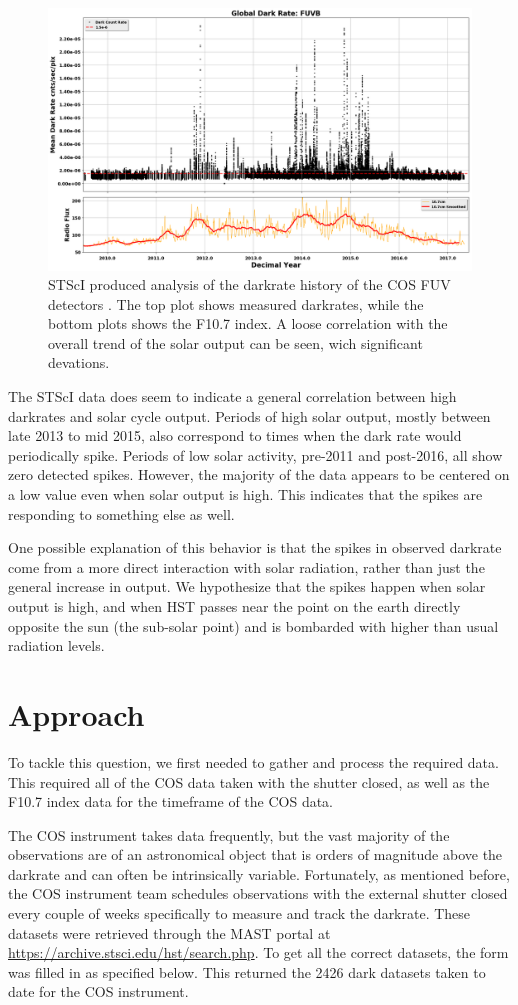 \documentclass[a4paper,11pt]{article}
\begin{document}
\begin{figure}[h!]
\caption{STScI produced analysis of the darkrate history of the COS FUV detectors \cite{fox}. The top plot shows 
measured darkrates, while the bottom plots shows the F10.7 index.  A loose correlation with the overall trend of the
solar output can be seen, wich significant devations.}
\centering
\includegraphics[width=.8\textwidth]{dark_vs_time_FUVB.png}
\end{figure}

The STScI data does seem to indicate a general correlation between high darkrates and solar cycle output.  Periods of 
high solar output, mostly between late 2013 to mid 2015, also correspond to times when the dark rate would 
periodically spike.  Periods of low solar activity, pre-2011 and post-2016, all show zero detected spikes.  However, the 
majority of the data appears to be centered on a low value even when solar output is high.  This indicates that the 
spikes are responding to something else as well.

One possible explanation of this behavior is that the spikes in observed darkrate come from a more direct interaction 
with solar radiation, rather than just the general increase in output.  We hypothesize that the spikes happen when solar output is high, and when HST passes near the point on the earth directly opposite the sun (the sub-solar point) and 
is bombarded with higher than usual radiation levels.

\section{Approach}
To tackle this question, we first needed to gather and process the required data. This
required all of the COS data taken with the shutter closed, as well as the F10.7 index data for the 
timeframe of the COS data. 

The COS instrument takes data frequently, but the vast majority of the observations are of
an astronomical object that is orders of magnitude above the darkrate and can often be 
intrinsically variable.  Fortunately, as mentioned before, the COS instrument team schedules observations with the 
external shutter closed every couple of weeks specifically to measure and track the darkrate.
These datasets were retrieved through the MAST portal at \href{https://archive.stsci.edu/hst/search.php}{https://archive.stsci.edu/hst/search.php}.  To get all the correct datasets, the form was  filled in as specified below.  This returned the 2426 dark datasets taken to date for the COS instrument.
\end{document}
